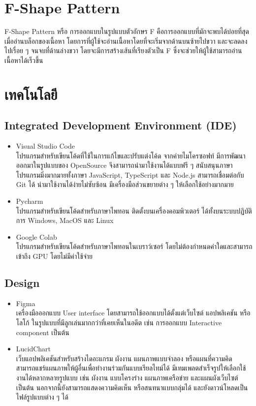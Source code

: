 \documentclass[14pt,oneside,openright,a4paper]{cpe-thai-project}
\begin{document}
\section {F-Shape Pattern}
  F-Shape Pattern \cite{Fshape} หรือ การออกแบบในรูปแบบตัวอักษร F คือการออกแบบที่มักจะพบได้บ่อยที่สุดเมื่ออ่านบล็อกของเนื้อหา
  โดยการที่ผู้ใช้จะอ่านเนื้อหาโดยที่จะเริ่มจากด้านบนซ้ายไปขวา และจะลดลงไปเรื่อย ๆ จนจบที่ด้านล่างขวา โดยจะมีการสร้างเส้นที่เรียงตัวเป็น F ซึ่งจะช่วยให้ผู้ใช้สามารถอ่านเนื้อหาได้เร็วขึ้น

\newpage

\section{เทคโนโลยี}
  \subsection{Integrated Development Environment (IDE)}

    \begin{itemize}
      \item Visual Studio Code \cite{VSCode} \\ 
        โปรแกรมสำหรับเขียนโค้ดที่ใช้ในการแก้ไขและปรับแต่งโค้ด จากค่ายไมโครซอฟท์ มีการพัฒนาออกมาในรูปแบบของ OpenSource จึงสามารถนำมาใช้งานได้แบบฟรี ๆ สนับสนุนภาษาโปรแกรมมิ่งมากมายทั้งภาษา JavaScript, TypeScript และ Node.js สามารถเชื่อมต่อกับ Git ได้ นำมาใช้งานได้ง่ายไม่ซับซ้อน มีเครื่องมือส่วนขยายต่าง ๆ ให้เลือกใช้อย่างมากมาย
      \item Pycharm \cite{Pycharm} \\ 
        โปรแกรมสำหรับเขียนโค้ดสำหรับภาษาไพทอน ติดตั้งบนเครื่องคอมพิวเตอร์ ได้ทั้งบนระบบปฏิบัติการ Windows, MacOS และ Linux 
      \item Google Colab \cite{Colab} \\ 
        โปรแกรมสำหรับเขียนโค้ดสำหรับภาษาไพทอนในเบราว์เซอร์ โดยไม่ต้องกำหนดค่าใดและสามารถเข้าถึง GPU โดยไม่มีค่าใช้จ่าย
    \end{itemize}

  \subsection{Design}
    \begin{itemize}
      \item Figma \cite{Figma} \\ 
        เครื่องมือออกแบบ User interface โดยสามารถใช้ออกแบบได้ตั้งแต่เว็บไซต์ แอปพลิเคชัน หรือโลโก้ ในรูปแบบที่มีลูกเล่นมากกว่าที่เคยเห็นในอดีต เช่น การออกแบบ Interactive component เป็นต้น
      \item LucidChart \cite{Lucidchart} \\ 
        เว็บแอปพลิเคชันสำหรับสร้างไดอะแกรม ผังงาน แผนภาพแบบจำลอง หรือแผนที่ความคิด สามารถแชร์แผนภาพให้ผู้อื่นเพื่อทำงานร่วมกันแบบเรียลไทม์ได้ มีเทมเพลตสำเร็จรูปให้เลือกใช้งานได้หลากหลายรูปแบบ เช่น ผังงาน แบบโครงร่าง แผนภาพเครือข่าย และแผนผังเว็บไซต์ เป็นต้น นอกจากนี้ยังสามารถแสดงความคิดเห็น หรือสนทนาแบบกลุ่มได้ และยังดาวน์โหลดเป็นไฟล์รูปแบบต่าง ๆ ได้
    \end{itemize}
\end{document}
